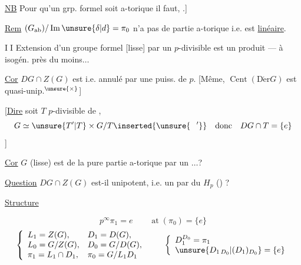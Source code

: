 \uline{NB} Pour qu'un grp. formel soit a-torique il faut,
 .]

\uline{Rem} $(G_{\mathrm{ab}})/\operatorname{Im}\unsure{\delta|d}=\pi_0$ n'a pas de partie a-torique i.e. est \uline{linéaire}.


\textcircled{II} Extension d'un groupe formel [lisse] par un $p$-divisible est
\inserted{[si $G$ lisse]}  un produit --- à isogén. près du moins$\ldots$

\uline{Cor} $DG\cap Z(G)$ est  i.e. annulé par une
puiss. de $p$. [Même,  $\operatorname{Cent}(\operatorname{D\acute{e}r}G)$ est quasi-unip.$^{\unsure{\times}}$]

[\uline{Dire} soit  $T$  $p$-divisible de  ,  
\[
G\simeq\unsure{T'|T}\times G/T\inserted{\unsure{\phantom{T}'}}\quad
\text{donc}\quad DG\cap T=\{e\}
\]
]

\uline{Cor} $G$ (lisse) est   de la pure partie a-torique par un $\ldots$?

\uline{Question} $DG\cap Z(G)$ est-il  unipotent, i.e.
un  par du $H_p$ () ?

\uline{Structure}


\[
p^\infty\pi_1=e\qquad \operatorname{at}(\pi_0)=\{e\}
\]
\[
\left\{\begin{array}{ll}
L_1=Z(G),&D_1=D(G),\\
L_0=G/Z(G),&D_0=G/D(G),\\
\pi_1=L_1\cap D_1,&\pi_0=G/L_1D_1
\end{array}\right.
\qquad
\left\{\begin{array}{l}
D_1^{D_0}=\pi_1\\
\unsure{D_{1\,D_0}|(D_1)_{D_0}}=\{e\}
\end{array}\right.
\]

